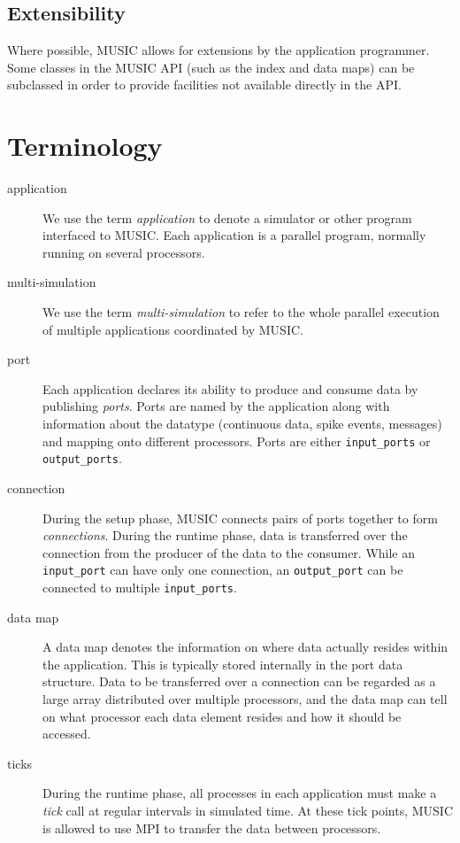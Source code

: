 \documentclass[a4paper]{report}
\begin{document}
\subsection{Extensibility}

Where possible, MUSIC allows for extensions by the application
programmer.  Some classes in the MUSIC API (such as the index and data
maps) can be subclassed in order to provide facilities not available
directly in the API.


\section{Terminology}

\begin{description}
\item[application] We use the term
  \emph{application} to denote a simulator or other
  program interfaced to MUSIC.  Each application is a parallel
  program, normally running on several processors.

\item[multi-simulation] We use the term
  \emph{multi-simulation} to refer to the
  whole parallel execution of multiple applications coordinated by
  MUSIC.

\item[port] Each application declares its ability to produce and
  consume data by publishing \emph{ports}.  Ports are
  named by the application along with information about the datatype
  (continuous data, spike events, messages) and mapping onto different
  processors.  Ports are either \lstinline|input_ports| or \lstinline|output_ports|.

\item[connection] During the setup phase, MUSIC connects pairs of
  ports together to form \emph{connections}.  During
  the runtime phase, data is transferred over the connection from the
  producer of the data to the consumer.  While an
  \lstinline|input_port| can have only one connection, an
  \lstinline|output_port| can be connected to multiple
  \lstinline|input_ports|.

\item[data map] A data map denotes the information on
  where data actually resides within the application.  This is
  typically stored internally in the port data structure.  Data to be
  transferred over a connection can be regarded as a large array
  distributed over multiple processors, and the data map can tell on
  what processor each data element resides and how it should be
  accessed.

\item[ticks] During the runtime phase, all processes in each
  application must make a \emph{tick} call at regular
  intervals in simulated time.  At these tick points, MUSIC is allowed
  to use MPI to transfer the data between processors.
\end{description}
\end{document}
